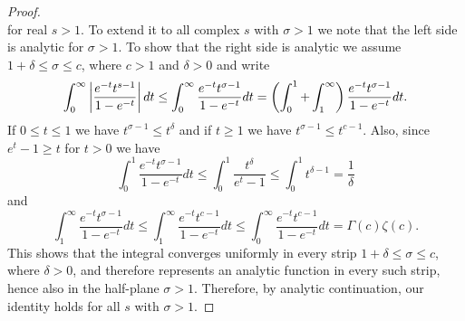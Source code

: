 \begin{proof}
\begin{equation*}
\end{equation*}
	for real $s > 1$. To extend it to all complex $s$ with $\sigma > 1$ we note that the left side is analytic for $\sigma > 1$. To show that the right side is analytic we assume $1 + \delta \leq \sigma \leq c$, where $c > 1$ and $\delta > 0$ and write
\begin{equation*}
	\int _0 ^\infty \left|\frac{e^{-t} t^{s - 1}}{1 - e^{-t}}\right| dt \leq \int _0 ^\infty \frac{e^{-t} t^{\sigma - 1}}{1 - e^{-t}} dt = \left(\int _0 ^1 + \int _1 ^\infty\right) \frac{e^{-t} t^{\sigma - 1}}{1 - e^{-t}} dt.
\end{equation*}
	If $0 \leq t \leq 1$ we have $t^{\sigma - 1} \leq t^\delta$ and if $t \geq 1$ we have $t^{\sigma - 1} \leq t^{c - 1}$. Also, since $e^t - 1 \geq t$ for $t > 0$ we have
\begin{equation*}
	\int _0 ^1 \frac{e^{-t} t^{\sigma - 1}}{1 - e^{-t}} dt \leq \int _0 ^1 \frac{t^\delta}{e^t - 1} \leq \int _0 ^1 t^{\delta - 1} = \frac{1}{\delta}
\end{equation*}
	and
\begin{equation*}
	\int _1 ^\infty \frac{e^{-t} t^{\sigma - 1}}{1 - e^{-t}} dt \leq \int _1 ^\infty \frac{e^{-t} t^{c - 1}}{1 - e^{-t}} dt \leq \int _0 ^\infty \frac{e^{-t} t^{c - 1}}{1 - e^{-t}} dt = \Gamma(c)\zeta(c).
\end{equation*}
	 This shows that the integral converges uniformly in every strip $1 + \delta \leq \sigma \leq c$, where $\delta > 0$, and therefore represents an analytic function in every such strip, hence also in the half-plane $\sigma > 1$. Therefore, by analytic continuation, our identity holds for all $s$ with $\sigma > 1$.
\end{proof}


